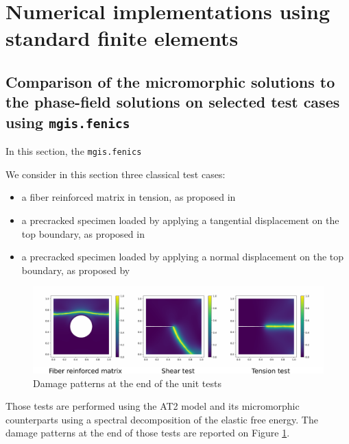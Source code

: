 \section{Numerical implementations using standard finite elements}

\subsection{Comparison of the micromorphic solutions to the phase-field solutions on selected test cases  using \texttt{mgis.fenics}}
\label{sec:micromorphicdamage:test_cases}

In this section, the
\texttt{mgis.fenics}


We consider in this section three classical test cases:

\begin{itemize}
  \item a fiber reinforced matrix in tension, as proposed in \cite{bourdin_numerical_2000}
  \item a precracked specimen loaded by applying a tangential displacement on
  the top boundary, as proposed in \cite{miehe_phase_2010}
  \item a precracked specimen loaded by applying a normal displacement on the
  top boundary, as proposed by \cite{miehe_phase_2010}
\end{itemize}


\begin{figure}[H]
  \centering
  \includegraphics[width=10.cm]{../chapter_003_ef_micromorphic/figures/DamagePattern.pdf}
  \caption{Damage patterns at the end of the unit tests}
  \label{fig:micromorphicdamage:damage_patterns}
\end{figure}


Those tests are performed using the AT2 model and its micromorphic
counterparts using a spectral decomposition of the elastic free energy.
The damage patterns at the end of those tests are reported on Figure
\ref{fig:micromorphicdamage:damage_patterns}.

